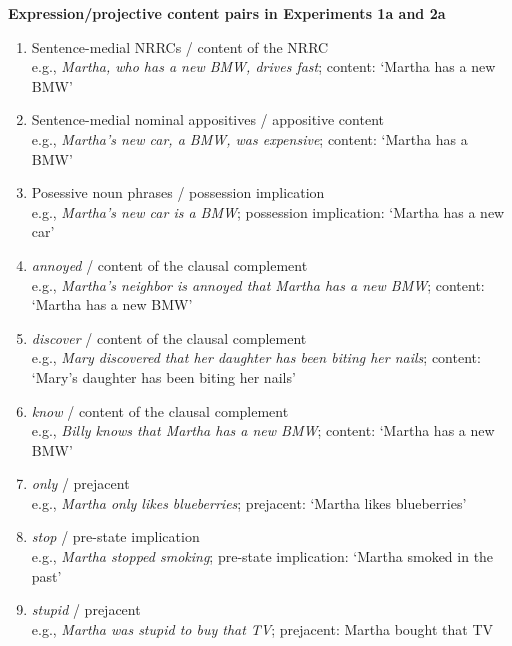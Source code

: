 \documentclass[11pt,fleqn]{article}
\newcommand{\6}{\mbox{$[\hspace*{-.6mm}[$}}
\newcommand{\9}{\mbox{$]\hspace*{-.6mm}]$}}
\begin{document}
\begin{exe}
\ex\label{pairs1a2a} {\bf Expression/projective content pairs in Experiments 1a and 2a}

\begin{enumerate}[itemsep=-.5mm]

\item Sentence-medial NRRCs / content of the NRRC
\\ e.g., {\em Martha, who has a new BMW, drives fast}; content: `Martha has a new BMW'

\item Sentence-medial nominal appositives / appositive content
\\ e.g., {\em Martha's new car, a BMW, was expensive}; content: `Martha has a BMW'

\item Posessive noun phrases / possession implication
\\ e.g., {\em Martha's new car is a BMW}; possession implication: `Martha has a new car'

\item {\em annoyed} / content of the clausal complement
\\ e.g., {\em Martha's neighbor is annoyed that Martha has a new BMW}; content: `Martha has a new BMW'

\item {\em discover} / content of the clausal complement
\\ e.g., {\em Mary discovered that her daughter has been biting her nails}; content: `Mary's daughter has been biting her nails'

\item {\em know} / content of the clausal complement
\\ e.g., {\em Billy knows that Martha has a new BMW}; content: `Martha has a new BMW'

\item {\em only} / prejacent
\\ e.g., {\em Martha only likes blueberries}; prejacent: `Martha likes blueberries'

\item {\em stop} / pre-state implication
\\ e.g., {\em Martha stopped smoking}; pre-state implication: `Martha smoked in the past'

\item {\em stupid} / prejacent
\\ e.g., {\em Martha was stupid to buy that TV}; prejacent: Martha bought that TV


\end{enumerate}
\end{exe}
\end{document}
